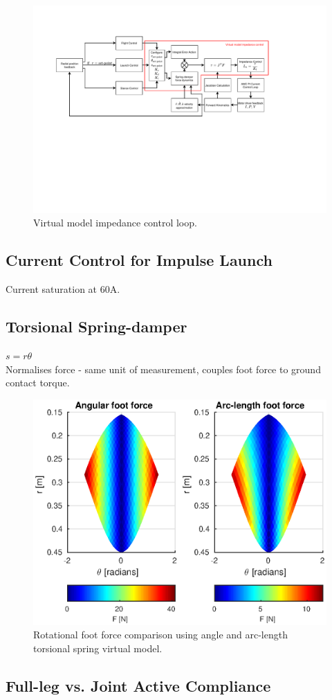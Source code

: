 \begin{figure}
\centering
\includegraphics[clip, trim=2cm 8cm 5cm 3cm, page = 1, width=1\textwidth]{images/control/virtual-model-impedance.pdf} 
\caption{Virtual model impedance control loop.}
\label{fig:virtual-model-impedance-loop}
\end{figure}

\subsection{Current Control for Impulse Launch}

Current saturation at 60A.

\subsection{Torsional Spring-damper}
$s = r \theta$\\

Normalises force - same unit of measurement, couples foot force to ground contact torque.

\begin{figure}
\centering
\includegraphics[width=1\textwidth]{images/control/theta-vs-arc.eps} 
\caption{Rotational foot force comparison using angle and arc-length torsional spring virtual model.}
\label{fig:Rotational foot force comparison}
\end{figure}

\subsection{Full-leg vs. Joint Active Compliance}